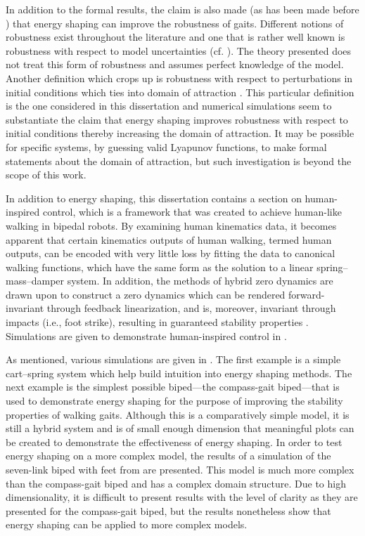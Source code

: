 In addition to the formal results, the claim is also made (as has been made
before \cite{Spong2003}) that energy shaping can improve the robustness of
gaits.
%
Different notions of robustness exist throughout the literature and one that is
rather well known is robustness with respect to model uncertainties
(cf. \cite{Freeman1996}).
%
The theory presented does not treat this form of robustness and assumes perfect
knowledge of the model.
%
Another definition which crops up is robustness with respect to perturbations in
initial conditions which ties into domain of attraction \cite{Chesi2011}.
%
This particular definition is the one considered in this dissertation and
numerical simulations seem to substantiate the claim that energy shaping
improves robustness with respect to initial conditions thereby increasing the
domain of attraction.
%
It may be possible for specific systems, by guessing valid Lyapunov functions,
to make formal statements about the domain of attraction, but such investigation
is beyond the scope of this work.

In addition to energy shaping, this dissertation contains a section on
human-inspired control, which is a framework that was created to achieve
human-like walking in bipedal robots.
%
By examining human kinematics data, it becomes apparent that certain
kinematics outputs of human walking, termed human outputs, can be encoded with
very little loss by fitting the data to canonical walking functions, which have
the same form as the solution to a linear spring--mass--damper system.
%
In addition, the methods of hybrid zero dynamics \cite{Morris2005} are drawn
upon to construct a zero dynamics which can be rendered forward-invariant
through feedback linearization, and is, moreover, invariant through impacts
(i.e., foot strike), resulting in guaranteed stability properties
\cite{Ames2012}.
%
Simulations are given to demonstrate human-inspired control in
.

As mentioned, various simulations are given in .
%
The first example is a simple cart--spring system which help build intuition
into energy shaping methods.
%
The next example is the simplest possible biped---the compass-gait
biped---that is used to demonstrate energy shaping for the purpose of improving
the stability properties of walking gaits.
%
Although this is a comparatively simple model, it is still a hybrid system and
is of small enough dimension that meaningful plots can be created to demonstrate
the effectiveness of energy shaping.
%
In order to test energy shaping on a more complex model, the results of a
simulation of the seven-link biped with feet from \cite{Grizzle2014} are
presented.
%
This model is much more complex than the compass-gait biped and has a complex
domain structure.
%
Due to high dimensionality, it is difficult to present results with the level of
clarity as they are presented for the compass-gait biped, but the results
nonetheless show that energy shaping can be applied to more complex models.

